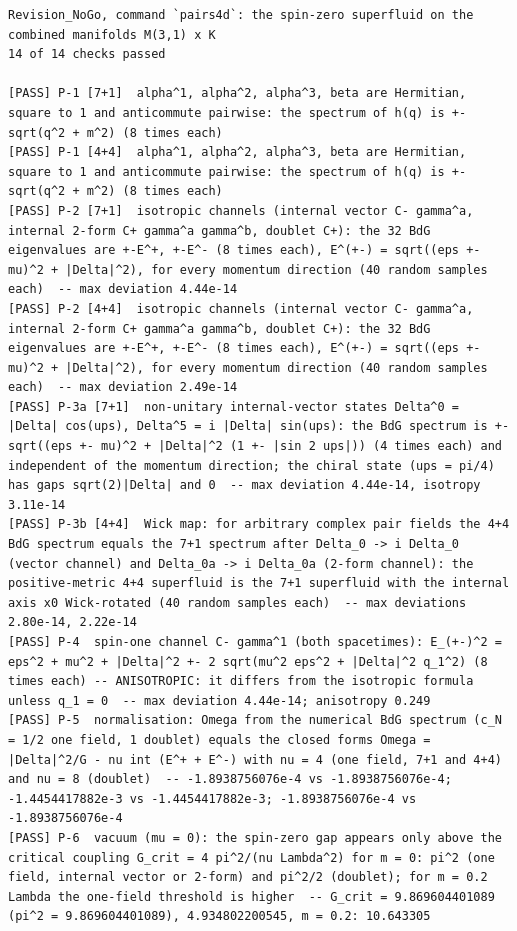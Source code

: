 \documentclass[
  10pt,
]{article}
\begin{document}
\begin{verbatim}
Revision_NoGo, command `pairs4d`: the spin-zero superfluid on the combined manifolds M(3,1) x K
14 of 14 checks passed

[PASS] P-1 [7+1]  alpha^1, alpha^2, alpha^3, beta are Hermitian, square to 1 and anticommute pairwise: the spectrum of h(q) is +-sqrt(q^2 + m^2) (8 times each)
[PASS] P-1 [4+4]  alpha^1, alpha^2, alpha^3, beta are Hermitian, square to 1 and anticommute pairwise: the spectrum of h(q) is +-sqrt(q^2 + m^2) (8 times each)
[PASS] P-2 [7+1]  isotropic channels (internal vector C- gamma^a, internal 2-form C+ gamma^a gamma^b, doublet C+): the 32 BdG eigenvalues are +-E^+, +-E^- (8 times each), E^(+-) = sqrt((eps +- mu)^2 + |Delta|^2), for every momentum direction (40 random samples each)  -- max deviation 4.44e-14
[PASS] P-2 [4+4]  isotropic channels (internal vector C- gamma^a, internal 2-form C+ gamma^a gamma^b, doublet C+): the 32 BdG eigenvalues are +-E^+, +-E^- (8 times each), E^(+-) = sqrt((eps +- mu)^2 + |Delta|^2), for every momentum direction (40 random samples each)  -- max deviation 2.49e-14
[PASS] P-3a [7+1]  non-unitary internal-vector states Delta^0 = |Delta| cos(ups), Delta^5 = i |Delta| sin(ups): the BdG spectrum is +-sqrt((eps +- mu)^2 + |Delta|^2 (1 +- |sin 2 ups|)) (4 times each) and independent of the momentum direction; the chiral state (ups = pi/4) has gaps sqrt(2)|Delta| and 0  -- max deviation 4.44e-14, isotropy 3.11e-14
[PASS] P-3b [4+4]  Wick map: for arbitrary complex pair fields the 4+4 BdG spectrum equals the 7+1 spectrum after Delta_0 -> i Delta_0 (vector channel) and Delta_0a -> i Delta_0a (2-form channel): the positive-metric 4+4 superfluid is the 7+1 superfluid with the internal axis x0 Wick-rotated (40 random samples each)  -- max deviations 2.80e-14, 2.22e-14
[PASS] P-4  spin-one channel C- gamma^1 (both spacetimes): E_(+-)^2 = eps^2 + mu^2 + |Delta|^2 +- 2 sqrt(mu^2 eps^2 + |Delta|^2 q_1^2) (8 times each) -- ANISOTROPIC: it differs from the isotropic formula unless q_1 = 0  -- max deviation 4.44e-14; anisotropy 0.249
[PASS] P-5  normalisation: Omega from the numerical BdG spectrum (c_N = 1/2 one field, 1 doublet) equals the closed forms Omega = |Delta|^2/G - nu int (E^+ + E^-) with nu = 4 (one field, 7+1 and 4+4) and nu = 8 (doublet)  -- -1.8938756076e-4 vs -1.8938756076e-4; -1.4454417882e-3 vs -1.4454417882e-3; -1.8938756076e-4 vs -1.8938756076e-4
[PASS] P-6  vacuum (mu = 0): the spin-zero gap appears only above the critical coupling G_crit = 4 pi^2/(nu Lambda^2) for m = 0: pi^2 (one field, internal vector or 2-form) and pi^2/2 (doublet); for m = 0.2 Lambda the one-field threshold is higher  -- G_crit = 9.869604401089 (pi^2 = 9.869604401089), 4.934802200545, m = 0.2: 10.643305

\end{verbatim}
\end{document}
